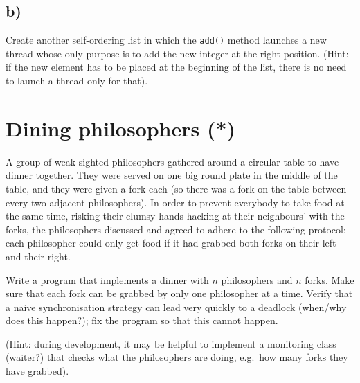 \documentclass{article}
\begin{document}
\subsection{b)}
\label{sec:b}

Create another self-ordering list in which the \verb+add()+ method
launches a new thread whose only purpose is to add the new integer at
the right position. (Hint: if the new element has to be placed at the
beginning of the list, there is no need to launch a thread only for
that). 


\section{Dining philosophers (*)}
\label{sec:dining-philosophers}

A group of weak-sighted philosophers gathered around a circular table
to have dinner together. They were served on one big round plate in
the middle of the table, and they were given a fork each (so there was
a fork on the table between every two adjacent philosophers). In order to
prevent everybody to take food at the same time, risking their clumsy
hands hacking at their neighbours' with the forks, 
the philosophers discussed and agreed to adhere to the following
protocol: each philosopher could only get food if it had grabbed both
forks on their left and their right. 

Write a program that implements a dinner with $n$ philosophers and $n$
forks. Make sure that each fork can be grabbed by only one philosopher
at a time. Verify that a naive synchronisation strategy can lead very
quickly to a deadlock (when/why does this happen?); 
fix the program so that this cannot happen. 

(Hint: during development, it may be helpful to implement a monitoring
class (waiter?)  that checks what the philosophers are doing, e.g.~how
many forks they have grabbed).
\end{document}
